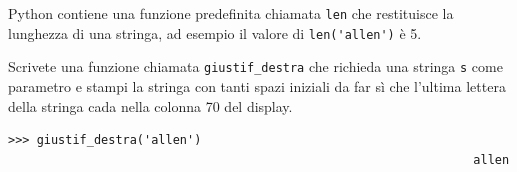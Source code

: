 \documentclass[10pt]{book}
\begin{document}
\begin{exercise}

Python contiene una funzione predefinita chiamata {\tt len} che restituisce la lunghezza di una stringa, ad esempio il valore di \verb"len('allen')" è 5.

Scrivete una funzione chiamata \verb"giustif_destra" che richieda una stringa {\tt s} come parametro e stampi la stringa con tanti spazi iniziali da far sì che l'ultima lettera della stringa cada nella colonna 70 del display.

\begin{verbatim}
>>> giustif_destra('allen')
                                                                 allen
\end{verbatim}

\end{exercise}
\end{document}
